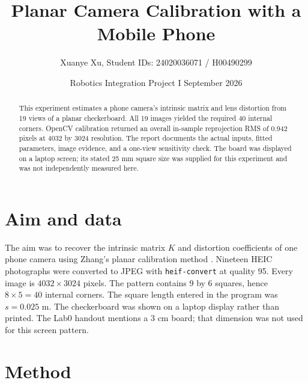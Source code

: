 \documentclass[justified]{tufte-handout}
\title{Planar Camera Calibration with a Mobile Phone}
\author{Xuanye Xu, Student IDs: 24020036071 / H00490299}
\date{Robotics Integration Project I \quad 25 September 2026}
\begin{document}
\maketitle

\begin{abstract}
This experiment estimates a phone camera's intrinsic matrix and lens distortion
from 19 views of a planar checkerboard. All 19 images yielded the required
40 internal corners. OpenCV calibration returned an overall in-sample
reprojection RMS of 0.942 pixels at 4032 by 3024 resolution. The report
documents the actual inputs, fitted parameters, image evidence, and a
one-view sensitivity check. The board was displayed on a laptop screen;
its stated 25 mm square size was supplied for this experiment and was not
independently measured here.
\end{abstract}

\section{Aim and data}

The aim was to recover the intrinsic matrix \(K\) and distortion coefficients
of one phone camera using Zhang's planar calibration method
\citep{zhang1999}.
Nineteen HEIC photographs were converted to JPEG with \texttt{heif-convert}
at quality 95. Every image is \(4032\times3024\) pixels. The pattern contains
9 by 6 squares, hence \(8\times5=40\) internal corners. The square length
entered in the program was \(s=0.025\) m. The checkerboard was shown on a
laptop display rather than printed. The Lab0 handout mentions a 3 cm
board; that dimension was not used for this screen pattern.

\section{Method}
\end{document}
